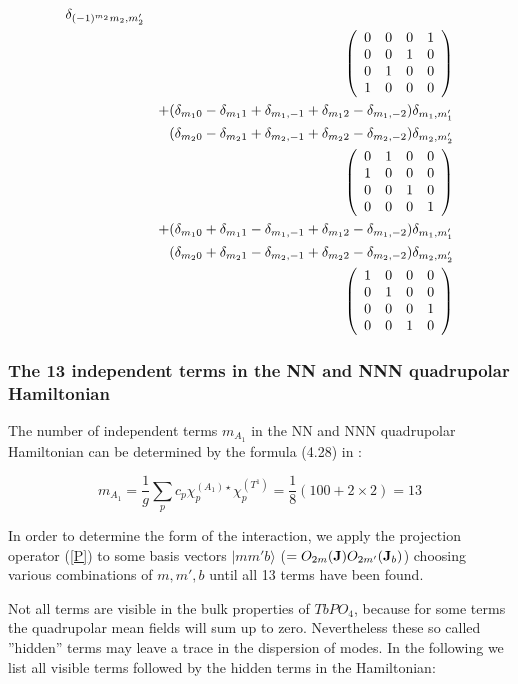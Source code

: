 \begin{eqnarray}
\delta_{(-1)^{m_2}m_2,m'_2}\\ \nonumber
&&\left (
\begin{array}{cccc}
0 & 0 & 0 & 1 \\
0 & 0 & 1 & 0 \\
0 & 1 & 0 & 0 \\
1 & 0 & 0 & 0 
\end{array} \right )\\ \nonumber
&&+(\delta_{m_10}-\delta_{m_11}+\delta_{m_1,-1}+\delta_{m_12}-\delta_{m_1,-2})
\delta_{m_1,m'_1}\\ \nonumber
&&(\delta_{m_20}-\delta_{m_21}+\delta_{m_2,-1}+\delta_{m_22}-\delta_{m_2,-2})
\delta_{m_2,m'_2}\\ \nonumber
&&\left (
\begin{array}{cccc}
0 & 1 & 0 & 0 \\
1 & 0 & 0 & 0 \\
0 & 0 & 1 & 0 \\
0 & 0 & 0 & 1 
\end{array} \right )\\ \nonumber
&&+(\delta_{m_10}+\delta_{m_11}-\delta_{m_1,-1}+\delta_{m_12}-\delta_{m_1,-2})
\delta_{m_1,m'_1}\\ \nonumber
&&(\delta_{m_20}+\delta_{m_21}-\delta_{m_2,-1}+\delta_{m_22}-\delta_{m_2,-2})
\delta_{m_2,m'_2}\\ \nonumber
&&\left (
\begin{array}{cccc}
1 & 0 & 0 & 0 \\
0 & 1 & 0 & 0 \\
0 & 0 & 0 & 1 \\
0 & 0 & 1 & 0 
\end{array} \right )
\end{eqnarray}



\subsubsection{The 13 independent terms in the NN and NNN quadrupolar Hamiltonian}\label{13ind}

The number of independent terms $m_{A_1}$ in the NN and NNN quadrupolar Hamiltonian can be
determined by the formula (4.28) in \cite{elliott79-1}:

\begin{equation}
m_{A_1}=\frac{1}{g}\sum_p c_p \chi^{(A_1)\star}_p \chi^{(T^1)}_p = \frac{1}{8} (100+2\times2)=13
\end{equation}

In order to determine the form of the interaction, we apply the projection operator
(\ref{P}) to some basis vectors $|mm'b\rangle$ ($=O_{2m}(\mathbf J)O_{2m'}(\mathbf J_b)$)
choosing various combinations of $m,m',b$ until all 13 terms have been found.

Not all terms are visible in the bulk properties of $TbPO_4$, because for some
terms the quadrupolar mean fields will sum up to zero. Nevertheless these so called 
''hidden'' terms may leave a trace in the dispersion of modes.
In the following we list all visible terms followed by the hidden terms in the
Hamiltonian:


